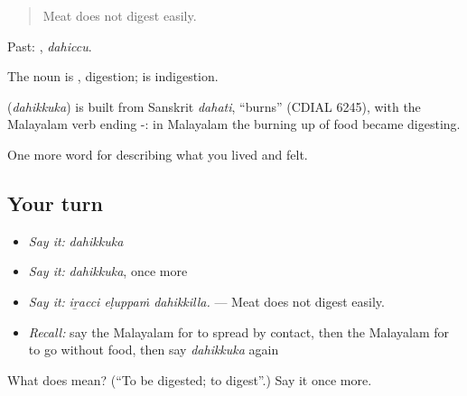 \begin{quote}
Meat does not digest easily.
\end{quote}

Past: , \emph{dahiccu}.

The noun is , digestion;  is indigestion.

\begin{cousinweb}
\textbf{} (\emph{dahikkuka}) is built from Sanskrit \emph{dahati}, \textquotedblleft{}burns\textquotedblright{} (CDIAL 6245), with the Malayalam verb ending -: in Malayalam the burning up of food became digesting.
\end{cousinweb}

\begin{grammarlens}[title={What you've built}]
One more word for describing what you lived and felt.
\end{grammarlens}

\subsection*{Your turn}
\begin{itemize}
\raggedright
  \item \emph{Say it:} \emph{dahikkuka}
  \item \emph{Say it:} \emph{dahikkuka}, once more
  \item \emph{Say it:} \emph{iṟacci eḷuppaṁ dahikkilla.} — Meat does not digest easily.
  \item \emph{Recall:} say the Malayalam for to spread by contact, then the Malayalam for to go without food, then say \emph{dahikkuka} again
\end{itemize}

\begin{tcolorbox}[breakable,colback=teal!4,colframe=teal!35!black,title={Before you move on}]
What does  mean? (\textquotedblleft{}To be digested; to digest\textquotedblright{}.) Say it once more.
\end{tcolorbox}
